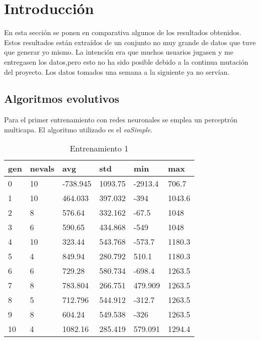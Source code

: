 

\section{Introducción}
En esta sección se ponen en comparativa algunos de los resultados obtenidos. Estos resultados están extraídos de un conjunto no muy grande de datos que tuve que generar yo mismo. La intención era que muchos usuarios jugasen y me entregasen los datos,pero esto no ha sido posible debido a la continua mutación del proyecto. Los datos tomados una semana a la siguiente ya no servían. 

\subsection{Algoritmos evolutivos}

Para el primer entrenamiento con redes neuronales se emplea un perceptrón multicapa. El algoritmo utilizado es el \emph{eaSimple}.

\begin{table}[]
\centering
\begin{tabular}{|l|l|l|l|l|l|}
\hline
\rowcolor[HTML]{EFEFEF} 
gen & nevals & avg      & std     & min     & max    \\ \hline
0   & 10     & -738.945 & 1093.75 & -2913.4 & 706.7  \\ \hline
1   & 10     & 464.033  & 397.032 & -394    & 1043.6 \\ \hline
2   & 8      & 576.64   & 332.162 & -67.5   & 1048   \\ \hline
3   & 6      & 590.65   & 434.868 & -549    & 1048   \\ \hline
4   & 10     & 323.44   & 543.768 & -573.7  & 1180.3 \\ \hline
5   & 4      & 849.94   & 280.792 & 510.1   & 1180.3 \\ \hline
6   & 6      & 729.28   & 580.734 & -698.4  & 1263.5 \\ \hline
7   & 8      & 783.804  & 266.751 & 479.909 & 1263.5 \\ \hline
8   & 5      & 712.796  & 544.912 & -312.7  & 1263.5 \\ \hline
9   & 8      & 604.24   & 549.538 & -326    & 1263.5 \\ \hline
10  & 4      & 1082.16  & 285.419 & 579.091 & 1294.4 \\ \hline
\end{tabular}
\caption{Entrenamiento 1}
\label{tab:entr1}
\end{table}



